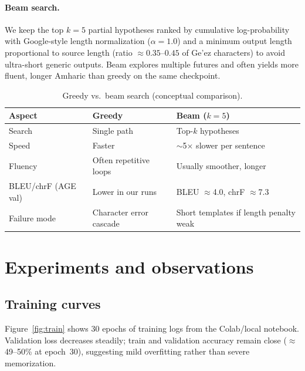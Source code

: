 \documentclass[11pt,a4paper]{article}
\begin{document}
\paragraph{Beam search.}
We keep the top $k{=}5$ partial hypotheses ranked by cumulative log-probability with Google-style length normalization ($\alpha{=}1.0$) and a minimum output length proportional to source length (ratio ${\approx}0.35$--$0.45$ of Ge'ez characters) to avoid ultra-short generic outputs. Beam explores multiple futures and often yields more fluent, longer Amharic than greedy on the same checkpoint.

\begin{table}[H]
  \centering
  \caption{Greedy vs.\ beam search (conceptual comparison).}
  \label{tab:decode}
  \begin{tabular}{@{}lll@{}}
    \toprule
    \textbf{Aspect} & \textbf{Greedy} & \textbf{Beam ($k{=}5$)} \\
    \midrule
    Search & Single path & Top-$k$ hypotheses \\
    Speed & Faster & $\sim$5$\times$ slower per sentence \\
    Fluency & Often repetitive loops & Usually smoother, longer \\
    BLEU/chrF (AGE val) & Lower in our runs & BLEU $\approx$4.0, chrF $\approx$7.3 \\
    Failure mode & Character error cascade & Short templates if length penalty weak \\
    \bottomrule
  \end{tabular}
\end{table}

\section{Experiments and observations}
\subsection{Training curves}
Figure~\ref{fig:train} shows 30 epochs of training logs from the Colab/local notebook. Validation loss decreases steadily; train and validation accuracy remain close ($\approx$49--50\% at epoch~30), suggesting mild overfitting rather than severe memorization.
\end{document}
